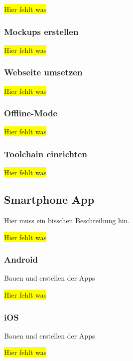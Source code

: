 \colorbox{yellow}{Hier fehlt was}

\subsubsection{Mockups erstellen}
\colorbox{yellow}{Hier fehlt was}

\subsubsection{Webseite umsetzen}
\colorbox{yellow}{Hier fehlt was}

\subsubsection{Offline-Mode}
\colorbox{yellow}{Hier fehlt was}

\subsubsection{Toolchain einrichten}
\colorbox{yellow}{Hier fehlt was}

\subsection{Smartphone App}
Hier muss ein bisschen Beschreibung hin.

\colorbox{yellow}{Hier fehlt was}

\subsubsection{Android}
Bauen und erstellen der Apps

\colorbox{yellow}{Hier fehlt was}

\subsubsection{iOS}
Bauen und erstellen der Apps

\colorbox{yellow}{Hier fehlt was}